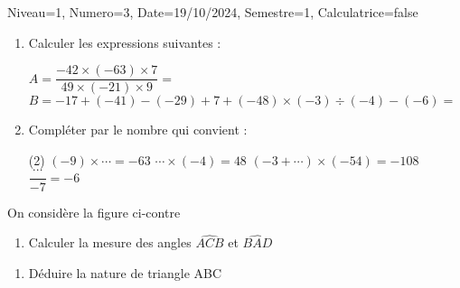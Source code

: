 \documentclass[a4paper,12pt]{article}
\begin{document}
\begin{Maquette}[DS]{Niveau=1, Numero=3, Date=19/10/2024, Semestre=1, Calculatrice=false}

\begin{exercice}
\begin{enumerate}
\item{} Calculer les expressions suivantes :

$A= \dfrac{-42\times (-63)\times 7}{49\times (-21)\times 9}=$\anserline[2]
$B=-17+(-41)-(-29)+7+(-48)\times (-3)\div (-4)-(-6)=$\anserline[3]\vspace{-1cm}
\item{} Compléter par le nombre qui convient :
\begin{tasks}[style=itemize](2)
\task $(-9)\times \cdots = -63$
\task $ \cdots \times (-4) = 48$
\task $(-3+ \cdots )\times (-54)= -108$
\task $\dfrac{\cdots}{-7}=-6$
\end{tasks} 
\end{enumerate}
\end{exercice}

\begin{exercice}
\begin{minipage}{.65\linewidth}
On considère la figure ci-contre 
\begin{enumerate}
\item{} Calculer la mesure des angles $\widehat{ACB}$ et $\widehat{BAD}$ \newline\anserline[3]
\end{enumerate}
\end{minipage}
\begin{minipage}{.35\linewidth}
\end{minipage}
\begin{enumerate}[start=2]
\item{} Déduire la nature de triangle ABC
\anserline[4] 
\end{enumerate}
\end{exercice}

\end{Maquette}
\end{document}
